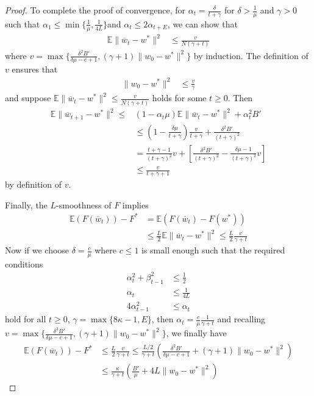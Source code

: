 \begin{proof}
	To complete the proof of convergence, for $\alpha_{t}=\frac{\delta}{t+\gamma}$
	for $\delta>\frac{1}{\mu}$ and $\gamma>0$ such that $\alpha_{1}\leq\min\{\frac{1}{\mu},\frac{1}{4L}\}$and
	$\alpha_{t}\leq2\alpha_{t+E}$, we can show that 
	\begin{align*}
	\mathbb{E}\|\overline{w}_{t}-w^{\ast}\|^{2} & \leq\frac{v}{N(\gamma+t)}
	\end{align*}
	where $v=\max\{\frac{\delta^{2}B'}{\delta\mu-c+1},(\gamma+1)\|w_{0}-w^{\ast}\|^{2}\}$
	by induction. The definition of $v$ ensures that 
	\begin{align*}
	\|w_{0}-w^{\ast}\|^{2} & \leq\frac{v}{\gamma}
	\end{align*}
	and suppose $\mathbb{E}\|\overline{w}_{t}-w^{\ast}\|^{2}\leq\frac{v}{N(\gamma+t)}$
	holds for some $t\geq0$. Then 
	\begin{align*}
	\mathbb{E}\|\overline{w}_{t+1}-w^{\ast}\|^{2}\leq & (1-\alpha_{t}\mu)\mathbb{E}\|\overline{w}_{t}-w^{\ast}\|^{2}+\alpha_{t}^{2}B'\\
	& \leq(1-\frac{\delta\mu}{t+\gamma})\frac{v}{t+\gamma}+\frac{\delta^{2}B'}{(t+\gamma)^{2}}\\
	& =\frac{t+\gamma-1}{(t+\gamma)^{2}}v+\left[\frac{\delta^{2}B'}{(t+\gamma)^{2}}-\frac{\delta\mu-1}{(t+\gamma)^{2}}v\right]\\
	& \leq\frac{v}{t+\gamma+1}
	\end{align*}
	by definition of $v$.
	
	Finally, the $L$-smoothness of $F$ implies 
	\begin{align*}
	\mathbb{E}(F(\overline{w}_{t}))-F^{\ast} & =\mathbb{E}(F(\overline{w}_{t})-F(w^{\ast}))\\
	& \leq\frac{L}{2}\mathbb{E}\|\overline{w}_{t}-w^{\ast}\|^{2}\leq\frac{L}{2}\frac{v}{\gamma+t}
	\end{align*}
	Now if we choose $\delta=\frac{c}{\mu}$ where $c\leq1$ is small
	enough such that the required conditions 
	\begin{align*}
	\alpha_{t}^{2}+\beta_{t-1}^{2} & \leq\frac{1}{2}\\
	\alpha_{t} & \leq\frac{1}{4L}\\
	4\alpha_{t-1}^{2} & \leq\alpha_{t}
	\end{align*}
	hold for all $t\geq0$, $\gamma=\max\{8\kappa-1,E\}$, then $\alpha_{t}=\frac{c}{\mu}\frac{1}{\gamma+t}$
	and recalling $v=\max\{\frac{\delta^{2}B'}{\delta\mu-c+1},(\gamma+1)\|w_{0}-w^{\ast}\|^{2}\}$,
	we finally have 
	\begin{align*}
	\mathbb{E}(F(\overline{w}_{t}))-F^{\ast} & \leq\frac{L}{2}\frac{v}{\gamma+t}\leq\frac{L/2}{\gamma+t}(\frac{\delta^{2}B'}{\delta\mu-c+1}+(\gamma+1)\|w_{0}-w^{\ast}\|^{2})\\
	& \leq\frac{\kappa}{\gamma+t}(\frac{B'}{\mu}+4L\|w_{0}-w^{\ast}\|^{2})
	\end{align*}
	

\end{proof}
